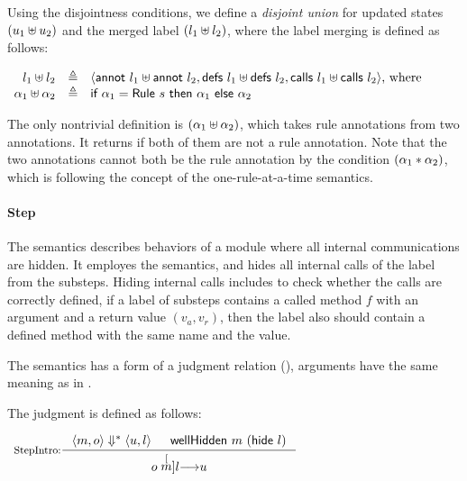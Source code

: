 Using the disjointness conditions, we define a \emph{disjoint union}
for updated states $(u_1 \uplus u_2)$ and the merged label
$(l_1 \uplus l_2)$, where the label merging is defined as follows:

\begin{definition}
  \label{def-lplus}
  \mbox{}
  \begin{center}
    \begin{math}
      \begin{array}{rcl}
        l_1 \uplus l_2 & \triangleq &
        \langle \textsf{annot}\ l_1 \uplus \textsf{annot}\ l_2, \textsf{defs}\ l_1 \uplus \textsf{defs}\ l_2, \textsf{calls}\ l_1 \uplus \textsf{calls}\ l_2 \rangle \textrm{, where} \\
        \alpha_1 \uplus \alpha_2 & \triangleq &
        \textsf{if}\ \alpha_1 = \textsf{Rule}\ s\ \textsf{then}\ \alpha_1\
        \textsf{else}\ \alpha_2 \\
      \end{array}
    \end{math}
  \end{center}
\end{definition}

The only nontrivial definition is $(\alpha_1 \uplus \alpha_2)$,
which takes rule annotations from two annotations. It returns
\alphameth{} if both of them are not a rule annotation. Note that the
two annotations cannot both be the rule annotation by the condition
$(\alpha_1 \ast \alpha_2)$, which is following the concept of
the one-rule-at-a-time semantics.

\paragraph{Step}
The \Step{} semantics describes behaviors of a module where all
internal communications are hidden. It employes the \Substep{}
semantics, and hides all internal calls of the label from the
substeps. Hiding internal calls includes to check whether the calls
are correctly defined, \ie{} if a label of substeps contains a called
method $f$ with an argument and a return value $(v_a, v_r)$, then the
label also should contain a defined method with the same name and the
value.

The \Step{} semantics has a form of a judgment relation
(), arguments have the same meaning as in
\Substeps{}.

\begin{definition}
  \label{def-semstep}
  The judgment  is defined as follows:
  \begin{center}
    \begin{math}
      \begin{array}{c}
        \inference[StepIntro:]{\semsss{m}{o}{u}{l} & \wellhidden{m}{(\hide{l})}}
                  {\semstep{m}{o}{u}{l}} \\
        \mbox{} \\
      \end{array}
    \end{math}
  \end{center}
\end{definition}

